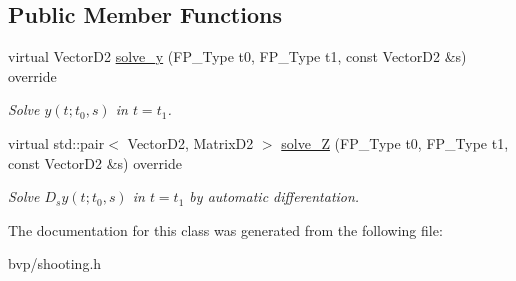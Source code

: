 \subsection*{Public Member Functions}
\begin{DoxyCompactItemize}
\item 
\mbox{\label{classSF__Automatic_a1805f867ada14ddc960d72da0c8717c5}} 
virtual Vector\+D2 \hyperlink{classSF__Automatic_a1805f867ada14ddc960d72da0c8717c5}{solve\+\_\+y} (F\+P\+\_\+\+Type t0, F\+P\+\_\+\+Type t1, const Vector\+D2 \&s) override
\begin{DoxyCompactList}\small\item\em Solve $y(t; t_0, s)$ in $t = t_1$. \end{DoxyCompactList}\item 
\mbox{\label{classSF__Automatic_a42df8fe14e093057d2fe40cb42a0460e}} 
virtual std\+::pair$<$ Vector\+D2, Matrix\+D2 $>$ \hyperlink{classSF__Automatic_a42df8fe14e093057d2fe40cb42a0460e}{solve\+\_\+Z} (F\+P\+\_\+\+Type t0, F\+P\+\_\+\+Type t1, const Vector\+D2 \&s) override
\begin{DoxyCompactList}\small\item\em Solve $D_s y(t; t_0, s)$ in $t = t_1$ by automatic differentation. \end{DoxyCompactList}\end{DoxyCompactItemize}


The documentation for this class was generated from the following file\+:\begin{DoxyCompactItemize}
\item 
bvp/shooting.\+h\end{DoxyCompactItemize}
